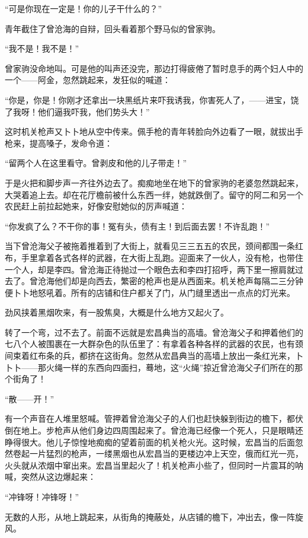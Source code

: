 \par “可是你现在一定是！你的儿子干什么的？”
\par 青年截住了曾沧海的自辩，回头看着那个野马似的曾家驹。
\par “我不是！我不是！”
\par 曾家驹没命地叫。可是他的叫声还没完，那边打得疲倦了暂时息手的两个妇人中的一个——阿金，忽然跳起来，发狂似的喊道：
\par “你是，你是！你刚才还拿出一块黑纸片来吓我诱我，你害死人了，——进宝，饶了我呀！他们逼我吓我，他们势头大！”
\par 这时机关枪声又卜卜地从空中传来。佩手枪的青年转脸向外边看了一眼，就拔出手枪来，提高嗓子，发命令道：
\par “留两个人在这里看守。曾剥皮和他的儿子带走！”
\par 于是火把和脚步声一齐往外边去了。痴痴地坐在地下的曾家驹的老婆忽然跳起来，大哭着追上去。却在花厅檐前被什么东西一绊，她就跌倒了。留守的阿二和另一个农民赶上前拉起她来，好像安慰她似的厉声喊道：
\par “你发疯了么？不干你的事！冤有头，债有主！到后面去罢！不许乱跑！”
\par 当下曾沧海父子被拖着推着到了大街上，就看见三三五五的农民，颈间都围一条红布，手里拿着各式各样的武器，在大街上乱跑。迎面来了一伙人，没有枪，也带住一个人，却是李四。曾沧海正待抛过一个眼色去和李四打招呼，两下里一擦肩就过去了。曾沧海他们却是向西去，繁密的枪声也是从西面来。机关枪声每隔二三分钟便卜卜地怒吼着。所有的店铺和住户都关了门，从门缝里透出一点点的灯光来。
\par 劲风挟着黑烟吹来，有一股焦臭，大概是什么地方又起火了。
\par 转了一个弯，过不去了。前面不远就是宏昌典当的高墙。曾沧海父子和押着他们的七八个人被围裹在一大群杂色的队伍里了：有拿着各种各样的武器的农民，也有颈间束着红布条的兵，都挤在这街角。忽然从宏昌典当的高墙上放出一条红光来，卜卜卜——那火绳一样的东西向四面扫，蓦地，这“火绳”掠近曾沧海父子们所在的那个街角了！
\par “散——开！”
\par 有一个声音在人堆里怒喊。管押着曾沧海父子的人们也赶快躲到街边的檐下，都伏倒在地上。步枪声从他们身边四周围起来了。曾沧海已经像一个死人，只是眼睛还睁得很大。他儿子惊惶地痴痴的望着前面的机关枪火光。这时候，宏昌当的后面忽然卷起一片猛烈的枪声，一缕黑烟也从宏昌当的更楼边冲上天空，俄而红光一亮，火头就从浓烟中窜出来。宏昌当里起火了！机关枪声小些了，但同时一片震耳的呐喊，突然从这边爆起来：
\par “冲锋呀！冲锋呀！”
\par 无数的人形，从地上跳起来，从街角的掩蔽处，从店铺的檐下，冲出去，像一阵旋风。
